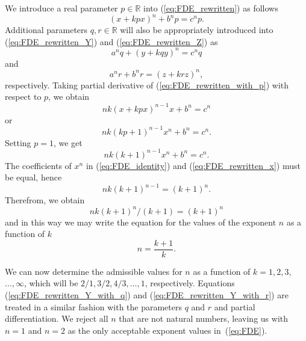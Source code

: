 \documentclass[11pt]{article}
\begin{document}
We introduce a real parameter
$p \in \mathbb{R}$ into (\ref{eq:FDE_rewritten}) as follows
\begin{equation}
\label{eq:FDE_rewritten_with_p}
(x + kpx)^{n} + b^{n} p = c^{n} p.
\end{equation}
Additional parameters $q, r \in \mathbb{R}$ will also be appropriately introduced into 
(\ref{eq:FDE_rewritten_Y})
and
(\ref{eq:FDE_rewritten_Z}) as
\begin{equation}
\label{eq:FDE_rewritten_Y_with_q}
a^{n} q + (y + kqy)^{n} = c^{n} q
\end{equation}
and
\begin{equation}
\label{eq:FDE_rewritten_Y_with_r}
a^{n} r + b^{n} r = (z + krz)^{n},
\end{equation}
respectively. Taking partial derivative of (\ref{eq:FDE_rewritten_with_p})
with respect to $p$, we obtain
\begin{equation}
\label{eq:FDE_rewritten_with_p_deriv}
nk(x + kpx)^{n-1} x + b^{n} = c^{n}
\end{equation}
or
\begin{equation}
\label{eq:FDE_rewritten_with_p_deriv_or}
nk(kp + 1)^{n-1} x^{n} + b^{n} = c^{n}.
\end{equation}
Setting $p=1$, we get
\begin{equation}
\label{eq:FDE_identity}
nk(k + 1)^{n-1} x^{n} + b^{n} = c^{n}.
\end{equation}
The coefficients of $x^{n}$ in (\ref{eq:FDE_identity}) and (\ref{eq:FDE_rewritten_x}) must be equal, hence
\begin{equation}
\label{eq:FDE_identity_a}
nk(k + 1)^{n-1} = (k + 1)^{n}.
\end{equation}
Therefrom, we obtain
\begin{equation}
\label{eq:FDE_identity_b}
nk(k + 1)^{n}/(k + 1) = (k + 1)^{n}
\end{equation}
and in this way we may write the equation for the values
of the exponent $n$ as a function of $k$
\begin{equation}
n = \frac{k+1}{k}.
\end{equation}

We can now determine the admissible values for $n$ as a function of $k = 1, 2, 3,$ $\ldots, \infty$, 
which will be $2/1, 3/2, 4/3, \ldots, 1$, respectively. 
Equations (\ref{eq:FDE_rewritten_Y_with_q}) and (\ref{eq:FDE_rewritten_Y_with_r}) are treated in a similar fashion
with the parameters $q$ and $r$ and partial differentiation.
We reject all $n$ that are not natural numbers, leaving us with $n = 1$ and $n = 2$ as the only acceptable exponent values in~(\ref{eq:FDE})\@.
\end{document}
